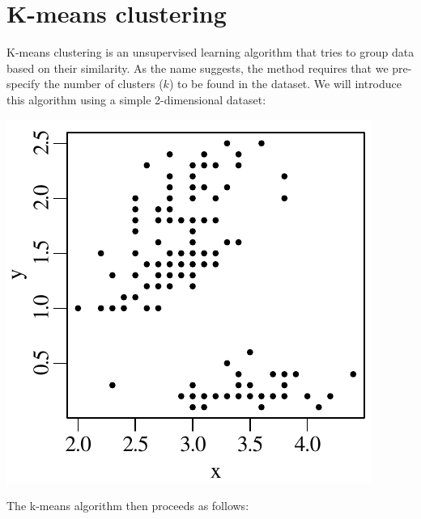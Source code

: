 \section{K-means clustering}
\label{sec:kmeans}

K-means clustering is an unsupervised learning algorithm that tries to
group data based on their similarity. As the name suggests, the method
requires that we pre-specify the number of clusters ($k$) to be found
in the dataset. We will introduce this algorithm using a simple
2-dimensional dataset:

\noindent\begin{minipage}[t][][b]{.25\textwidth}
  \includegraphics[width=\textwidth]{../figures/kmeans1.pdf}\medskip
\end{minipage}
\begin{minipage}[t][][t]{.75\textwidth}
  \label{fig:kmeans1}
\end{minipage}

The k-means algorithm then proceeds as follows:

